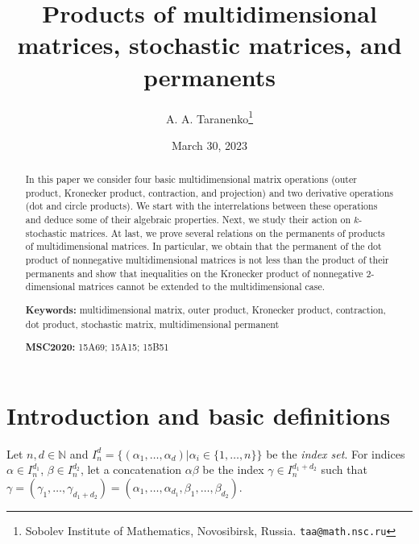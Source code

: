 \documentclass[a4paper]{article}
\begin{document}
\newcommand{\per}{{\rm per}}
\newcommand{\Per}{{\rm Per}}
\newtheorem{teorema}{Theorem}
\newtheorem{lemma}{Lemma}
\newtheorem{utv}{Proposition}
\newtheorem{svoistvo}{Property}
\newtheorem{sled}{Corollary}
\newtheorem{con}{Conjecture}
\newtheorem{zam}{Remark}
\newtheorem{quest}{Question}


\author{A. A. Taranenko\thanks{Sobolev Institute of Mathematics, Novosibirsk, Russia. 
 \texttt{taa@math.nsc.ru}}}
\title{Products of multidimensional matrices, stochastic matrices, and permanents}
\date{March 30, 2023}

\maketitle

\begin{abstract}
In this paper we consider four basic multidimensional matrix operations (outer product, Kronecker product, contraction, and projection)  and two derivative operations (dot and circle products).  We start with the interrelations between these operations and deduce some of their algebraic properties. Next, we study their action on $k$-stochastic matrices. At last, we prove several  relations on the permanents of products of multidimensional matrices. In particular, we obtain that the permanent of the dot product of nonnegative multidimensional matrices is not less than the product of their permanents and show that  inequalities on the Kronecker product of nonnegative 2-dimensional matrices  cannot be extended to the multidimensional case. 

\textbf{Keywords:} multidimensional matrix, outer product, Kronecker product, contraction, dot product, stochastic matrix, multidimensional permanent

\textbf{MSC2020:} 15A69; 15A15; 15B51
\end{abstract}



\section{Introduction and basic definitions}

Let $n, d \in \mathbb{N}$ and $I_n^d = \{  (\alpha_1, \ldots, \alpha_d) | \alpha_i \in \{ 1, \ldots, n \}\}$ be the \textit{index set}. For indices  $\alpha \in I_n^{d_1}$, $\beta \in I_n^{d_2}$, let a concatenation $\alpha \beta$ be the index  $\gamma \in I_n^{d_1 + d_2}$ such that $\gamma = (\gamma_1, \ldots, \gamma_{d_1 + d_2}) = (\alpha_1, \ldots, \alpha_{d_1}, \beta_1, \ldots, \beta_{d_2})$.  
\end{document}
